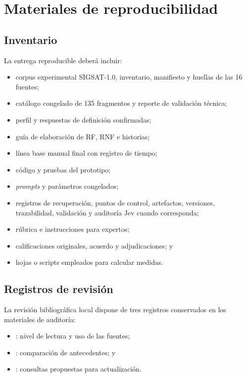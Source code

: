 \chapter{Materiales de reproducibilidad}
\label{anexo:materiales}

\section{Inventario}

La entrega reproducible deberá incluir:

\begin{itemize}
  \item corpus experimental SIGSAT-1.0, inventario, manifiesto y huellas de las 16 fuentes;
  \item catálogo congelado de 135 fragmentos y reporte de validación técnica;
  \item perfil y respuestas de definición confirmadas;
  \item guía de elaboración de RF, RNF e historias;
  \item línea base manual final con registro de tiempo;
  \item código y pruebas del prototipo;
  \item \emph{prompts} y parámetros congelados;
  \item registros de recuperación, puntos de control, artefactos, versiones, trazabilidad, validación y auditoría Jev cuando corresponda;
  \item rúbrica e instrucciones para expertos;
  \item calificaciones originales, acuerdo y adjudicaciones; y
  \item hojas o scripts empleados para calcular medidas.
\end{itemize}

\section{Registros de revisión}

La revisión bibliográfica local dispone de tres registros conservados en los materiales de auditoría:

\begin{itemize}
  \item {}: nivel de lectura y uso de las fuentes;
  \item {}: comparación de antecedentes; y
  \item {}: consultas propuestas para actualización.
\end{itemize}

